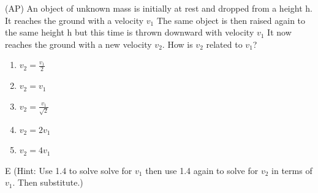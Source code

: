 \begin{question}
(AP) An object of unknown mass is initially at rest and dropped from a height h. It reaches the ground with a velocity $v_1$ The same object is then raised again to the same height h but this time is thrown downward with velocity $v_1$ It now reaches the ground with a new velocity $v_2$. How is $v_2$ related to $v_1$? 
\begin{multicols}{5}
\begin{enumerate}[label=(\alph*)]
    \item $v_2 = \frac{v_1}{2}$
    \item $v_2 = v_1$
    \item $v_2 = \frac{v_1}{\sqrt{2}}$
    \item $v_2 = 2v_1$
    \item $v_2 = 4v_1$
\end{enumerate}
\end{multicols}
\end{question}

\begin{solution}
E (Hint: Use 1.4 to solve solve for $v_1$ then use 1.4 again to solve for $v_2$ in terms of $v_1$. Then substitute.)
\end{solution}

